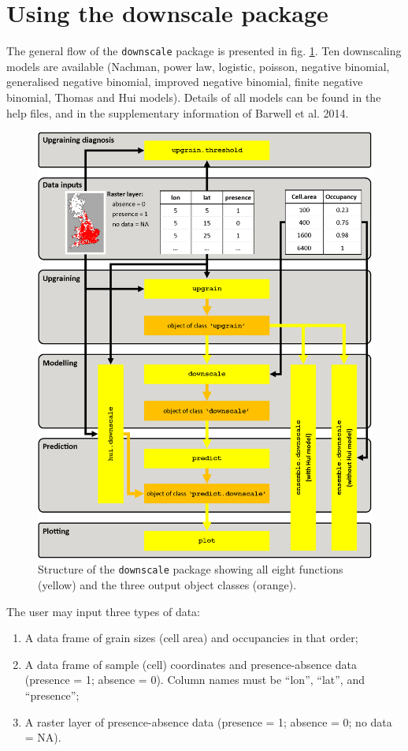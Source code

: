 \documentclass{article}[12pt, a4paper]
\begin{document}
\section{Using the downscale package}

The general flow of the \texttt{downscale} package is presented in fig. \ref{fig:Flow}. Ten downscaling models are available (Nachman, power law, logistic, poisson, negative binomial, generalised negative binomial, improved negative binomial, finite negative binomial, Thomas and Hui models). Details of all models can be found in the help files, and in the supplementary information of Barwell et al. 2014. 

\begin{figure}[!t]
\centering
\includegraphics[width=\linewidth]{Flow.png}
\caption{Structure of the \texttt{downscale} package showing all eight functions (yellow) and the three output object classes (orange).}
\label{fig:Flow}
\end{figure}

The user may input three types of data:
\begin{enumerate} \itemsep1pt \parskip0pt 
\item [1)] A data frame of grain sizes (cell area) and occupancies in that order;
\item [2)] A data frame of sample (cell) coordinates and presence-absence data (presence = 1; absence = 0). Column names must be “lon”, “lat”, and “presence”;
\item [3)] A raster layer of presence-absence data (presence = 1; absence = 0; no data = NA).
\end{enumerate}
\end{document}
